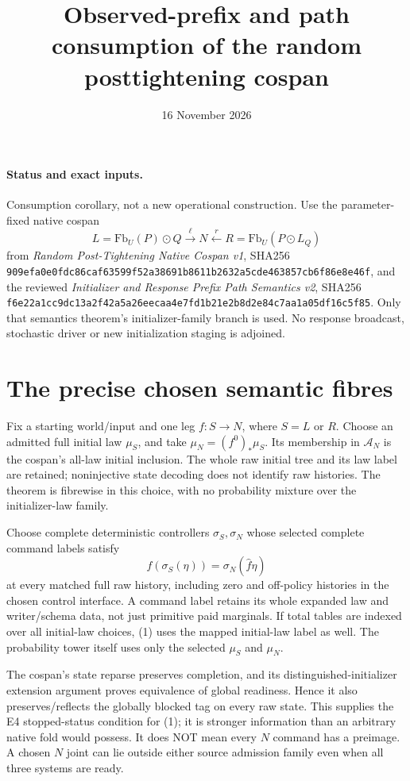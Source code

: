 \documentclass[11pt]{article}
\title{Observed-prefix and path consumption of the random posttightening cospan}
\date{16 November 2026}
\begin{document}
\maketitle
\paragraph{Status and exact inputs.}
Consumption corollary, not a new operational construction. Use the parameter-fixed native cospan
\[
 L=\mathrm{Fb}_U(P)\odot Q\xrightarrow{\ell}N
 \xleftarrow{r}R=\mathrm{Fb}_U(P\odot L_Q)
\]
from \emph{Random Post-Tightening Native Cospan v1}, SHA256
\texttt{909efa0e0fdc86caf63599f52a38691b8611b2632a5cde463857cb6f86e8e46f},
and the reviewed \emph{Initializer and Response Prefix Path Semantics v2}, SHA256
\texttt{f6e22a1cc9dc13a2f42a5a26eecaa4e7fd1b21e2b8d2e84c7aa1a05df16c5f85}.
Only that semantics theorem's initializer-family branch is used. No response broadcast, stochastic driver or new initialization staging is adjoined.

\section{The precise chosen semantic fibres}
Fix a starting world/input and one leg $f:S\to N$, where $S=L$ or $R$. Choose an admitted full initial law $\mu_S$, and take $\mu_N=(f^0)_*\mu_S$. Its membership in $\mathcal A_N$ is the cospan's all-law initial inclusion. The whole raw initial tree and its law label are retained; noninjective state decoding does not identify raw histories. The theorem is fibrewise in this choice, with no probability mixture over the initializer-law family.

Choose complete deterministic controllers $\sigma_S,\sigma_N$ whose selected complete command labels satisfy
\[
 f(\sigma_S(\eta))=\sigma_N(\widehat f\eta)           \tag{1}
\]
at every matched full raw history, including zero and off-policy histories in the chosen control interface. A command label retains its whole expanded law and writer/schema data, not just primitive paid marginals. If total tables are indexed over all initial-law choices, (1) uses the mapped initial-law label as well. The probability tower itself uses only the selected $\mu_S$ and $\mu_N$.

The cospan's state reparse preserves completion, and its distinguished-initializer extension argument proves equivalence of global readiness. Hence it also preserves/reflects the globally blocked tag on every raw state. This supplies the E4 stopped-status condition for (1); it is stronger information than an arbitrary native fold would possess. It does NOT mean every $N$ command has a preimage. A chosen $N$ joint can lie outside either source admission family even when all three systems are ready.
\end{document}
